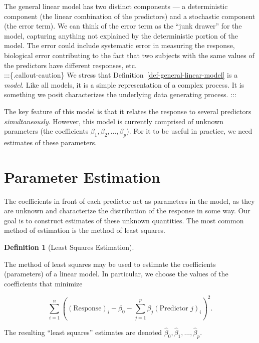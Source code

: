 \documentclass[
  letterpaper,
  DIV=11,
  numbers=noendperiod]{scrreprt}
\theoremstyle{definition}
\newtheorem{definition}{Definition}[chapter]
\theoremstyle{definition}
\theoremstyle{remark}
\begin{document}
The general linear model has two distinct components --- a deterministic
component (the linear combination of the predictors) and a stochastic
component (the error term). We can think of the error term as the ``junk
drawer'' for the model, capturing anything not explained by the
deterministic portion of the model. The error could include systematic
error in measuring the response, biological error contributing to the
fact that two subjects with the same values of the predictors have
different responses, etc.\\
:::\{.callout-caution\} We stress that
Definition~\ref{def-general-linear-model} is a \emph{model}. Like all
models, it is a simple representation of a complex process. It is
something we posit characterizes the underlying data generating process.
:::

The key feature of this model is that it relates the response to several
predictors \emph{simultaneously}. However, this model is currently
comprised of unknown parameters (the coefficients
\(\beta_1, \beta_2, \dotsc, \beta_p\)). For it to be useful in practice,
we need estimates of these parameters.

\hypertarget{parameter-estimation}{%
\section{Parameter Estimation}\label{parameter-estimation}}

The coefficients in front of each predictor act as parameters in the
model, as they are unknown and characterize the distribution of the
response in some way. Our goal is to construct estimates of these
unknown quantities. The most common method of estimation is the method
of least squares.

\begin{definition}[Least Squares
Estimation]\protect\hypertarget{def-least-squares}{}\label{def-least-squares}

The method of least squares may be used to estimate the coefficients
(parameters) of a linear model. In particular, we choose the values of
the coefficients that minimize

\[\sum\limits_{i=1}^{n} \left((\text{Response})_i - \beta_0 - \sum\limits_{j=1}^{p} \beta_j (\text{Predictor } j)_{i}\right)^2.\]

The resulting ``least squares'' estimates are denoted
\(\widehat{\beta}_0, \widehat{\beta}_1, \dotsc, \widehat{\beta}_p\).

\end{definition}
\end{document}
